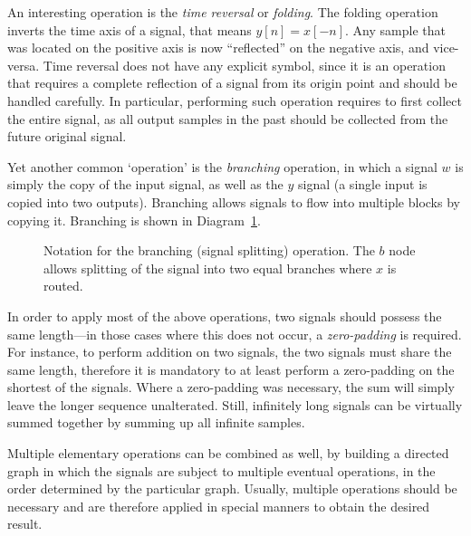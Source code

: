 \documentclass[\documentfontsize, twocolumn]{\classname}
\begin{document}
An interesting operation is the \emph{time reversal} or \emph{folding}. The folding operation inverts the time axis of a signal, that means $y[n] = x[-n]$. Any sample that was located on the positive axis is now ``reflected'' on the negative axis, and vice-versa. Time reversal does not have any explicit symbol, since it is an operation that requires a complete reflection of a signal from its origin point and should be handled carefully. In particular, performing such operation requires to first collect the entire signal, as all output samples in the past should be collected from the future original signal.

Yet another common `operation' is the \emph{branching} operation, in which a signal $w$ is simply the copy of the input signal, as well as the $y$ signal (a single input is copied into two outputs). Branching allows signals to flow into multiple blocks by copying it. Branching is shown in Diagram~\ref{tikz:branchingOperation}.
\begin{figure}[ht]
\begin{center}
    \caption{Notation for the branching (signal splitting) operation. The $b$ node allows splitting of the signal into two equal branches where $x$ is routed.}\label{tikz:branchingOperation}
\end{center}
\end{figure}

In order to apply most of the above operations, two signals should possess the same length---in those cases where this does not occur, a \emph{zero-padding} is required. For instance, to perform addition on two signals, the two signals must share the same length, therefore it is mandatory to at least perform a zero-padding on the shortest of the signals. Where a zero-padding was necessary, the sum will simply leave the longer sequence unalterated. Still, infinitely long signals can be virtually summed together by summing up all infinite samples.

Multiple elementary operations can be combined as well, by building a directed graph in which the signals are subject to multiple eventual operations, in the order determined by the particular graph. Usually, multiple operations should be necessary and are therefore applied in special manners to obtain the desired result.
\end{document}
